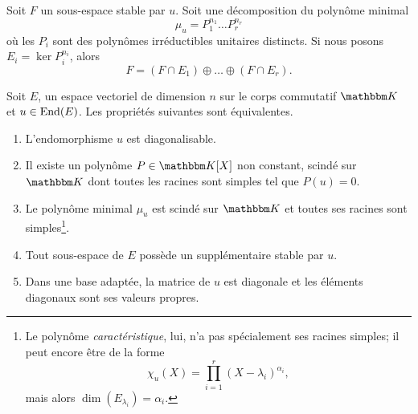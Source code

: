 \begin{lemma}       \label{LemgnaEOk}
    Soit \( F\) un sous-espace stable par \( u\). Soit une décomposition du polynôme minimal
    \begin{equation}
        \mu_u=P_1^{n_1}\ldots P_r^{n_r}
    \end{equation}
    où les \( P_i\) sont des polynômes irréductibles unitaires distincts. Si nous posons \( E_i=\ker P_i^{n_i}\), alors
    \begin{equation}
        F=(F\cap E_1)\oplus\ldots \oplus(F\cap E_r).
    \end{equation}
\end{lemma}

\begin{theorem}     \label{ThoDigLEQEXR}
    Soit \( E\), un espace vectoriel de dimension \( n\) sur le corps commutatif \( \eK\) et \( u\in\operatorname{End}(E)\). Les propriétés suivantes sont équivalentes.
    \begin{enumerate}
        \item\label{ItemThoDigLEQEXRiv}
            L'endomorphisme \( u\) est diagonalisable.
        \item       \label{ItemThoDigLEQEXRi}
            Il existe un polynôme \( P\in\eK[X]\) non constant, scindé sur \(\eK\) dont toutes les racines sont simples tel que \( P(u)=0\).
        \item\label{ItemThoDigLEQEXRii}
            Le polynôme minimal \( \mu_u\) est scindé sur \(\eK\) et toutes ses racines sont simples\footnote{Le polynôme \emph{caractéristique}, lui, n'a pas spécialement ses racines simples; il peut encore être de la forme
            \begin{equation}
                \chi_u(X)=\prod_{i=1}^r(X-\lambda_i)^{\alpha_i},
        \end{equation}
        mais alors \( \dim(E_{\lambda_i})=\alpha_i\). }.
        \item\label{ItemThoDigLEQEXRiii}
            Tout sous-espace de \( E\) possède un supplémentaire stable par \( u\).
        \item       \label{ITEMooZNJFooEiqDYp}
            Dans une base adaptée, la matrice de \( u\) est diagonale et les éléments diagonaux sont ses valeurs propres.
    \end{enumerate}
\end{theorem}

